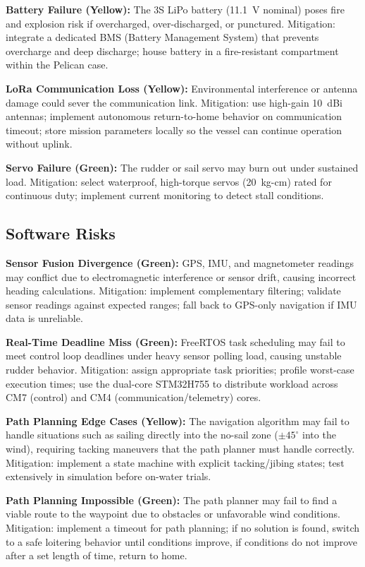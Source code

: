 \textbf{Battery Failure (Yellow):} The 3S LiPo battery (11.1~V nominal) poses fire and explosion risk if overcharged, over-discharged, or punctured. Mitigation: integrate a dedicated BMS (Battery Management System) that prevents overcharge and deep discharge; house battery in a fire-resistant compartment within the Pelican case.

\textbf{LoRa Communication Loss (Yellow):} Environmental interference or antenna damage could sever the communication link. Mitigation: use high-gain 10~dBi antennas; implement autonomous return-to-home behavior on communication timeout; store mission parameters locally so the vessel can continue operation without uplink.

\textbf{Servo Failure (Green):} The rudder or sail servo may burn out under sustained load. Mitigation: select waterproof, high-torque servos (20~kg-cm) rated for continuous duty; implement current monitoring to detect stall conditions.


\subsection{Software Risks}

\textbf{Sensor Fusion Divergence (Green):} GPS, IMU, and magnetometer readings may conflict due to electromagnetic interference or sensor drift, causing incorrect heading calculations. Mitigation: implement complementary filtering; validate sensor readings against expected ranges; fall back to GPS-only navigation if IMU data is unreliable.

\textbf{Real-Time Deadline Miss (Green):} FreeRTOS task scheduling may fail to meet control loop deadlines under heavy sensor polling load, causing unstable rudder behavior. Mitigation: assign appropriate task priorities; profile worst-case execution times; use the dual-core STM32H755 to distribute workload across CM7 (control) and CM4 (communication/telemetry) cores.

\textbf{Path Planning Edge Cases (Yellow):} The navigation algorithm may fail to handle situations such as sailing directly into the no-sail zone ($\pm45^{\circ}$ into the wind), requiring tacking maneuvers that the path planner must handle correctly. Mitigation: implement a state machine with explicit tacking/jibing states; test extensively in simulation before on-water trials.

\textbf{Path Planning Impossible (Green):} The path planner may fail to find a viable route to the waypoint due to obstacles or unfavorable wind conditions. Mitigation: implement a timeout for path planning; if no solution is found, switch to a safe loitering behavior until conditions improve, if conditions do not improve after a set length of time, return to home.

